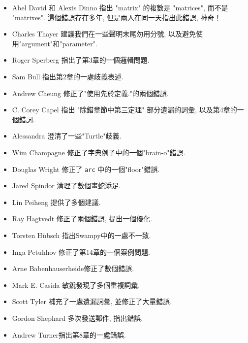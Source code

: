 \documentclass[10pt]{book}
\begin{document}
\begin{itemize}
\item Abel David 和 Alexis Dinno 指出 "matrix" 的複數是 "matrices", 
而不是 "matrixes". 這個錯誤存在多年, 但是兩人在同一天指出此錯誤, 神奇！

\item Charles Thayer 建議我們在一些聲明末尾勿用分號, 以及避免使用"argument"和"parameter". 

\item Roger Sperberg 指出了第3章的一個邏輯問題. 

\item Sam Bull 指出第2章的一處歧義表述. 

\item Andrew Cheung 修正了"使用先於定義."的兩個錯誤.

\item C. Corey Capel 指出 "除錯章節中第三定理" 部分遺漏的詞彙, 
以及第4章的一個錯詞. 

\item Alessandra 澄清了一些"Turtle"歧義. 

\item Wim Champagne 修正了字典例子中的一個"brain-o"錯誤. 

\item Douglas Wright 修正了 {\tt arc} 中的一個"floor"錯誤. 

\item Jared Spindor 清理了數個畫蛇添足. 

\item Lin Peiheng 提供了多個建議. 

\item Ray Hagtvedt 修正了兩個錯誤, 提出一個優化. 

\item Torsten H\"{u}bsch 指出Swampy中的一處不一致. 

\item Inga Petuhhov 修正了第14章的一個案例問題. 

\item Arne Babenhauserheide修正了數個錯誤. 

\item Mark E. Casida 敏銳發現了多個重複詞彙. 

\item Scott Tyler 補充了一處遺漏詞彙, 並修正了大量錯誤. 

\item Gordon Shephard 多次發送郵件, 指出錯誤. 

\item Andrew Turner指出第8章的一處錯誤. 


\end{itemize}
\end{document}
